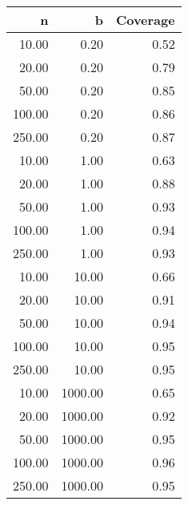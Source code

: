 \begin{tabular}{rrr}
  \hline
n & b & Coverage \\ 
  \hline
10.00 & 0.20 & 0.52 \\ 
  20.00 & 0.20 & 0.79 \\ 
  50.00 & 0.20 & 0.85 \\ 
  100.00 & 0.20 & 0.86 \\ 
  250.00 & 0.20 & 0.87 \\ 
  10.00 & 1.00 & 0.63 \\ 
  20.00 & 1.00 & 0.88 \\ 
  50.00 & 1.00 & 0.93 \\ 
  100.00 & 1.00 & 0.94 \\ 
  250.00 & 1.00 & 0.93 \\ 
  10.00 & 10.00 & 0.66 \\ 
  20.00 & 10.00 & 0.91 \\ 
  50.00 & 10.00 & 0.94 \\ 
  100.00 & 10.00 & 0.95 \\ 
  250.00 & 10.00 & 0.95 \\ 
  10.00 & 1000.00 & 0.65 \\ 
  20.00 & 1000.00 & 0.92 \\ 
  50.00 & 1000.00 & 0.95 \\ 
  100.00 & 1000.00 & 0.96 \\ 
  250.00 & 1000.00 & 0.95 \\ 
   \hline
\end{tabular}

